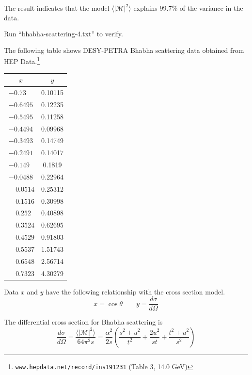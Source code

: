 \documentclass[12pt]{article}
\begin{document}
\noindent
The result indicates that the model $\langle|\mathcal{M}|^2\rangle$ explains
99.7\% of the variance in the data.

\bigskip
\noindent
Run ``bhabha-scattering-4.txt'' to verify.

\newpage
\noindent
The following table shows DESY-PETRA Bhabha scattering data obtained from
HEP Data.\footnote{{\tt www.hepdata.net/record/ins191231} (Table 3, 14.0 GeV)}

\begin{center}
\begin{tabular}{|c|c|}
\hline
$x$ & $y$\\
\hline
$-0.73\phantom{00}$ & 0.10115\\
$-0.6495$ & 0.12235\\
$-0.5495$ & 0.11258\\
$-0.4494$ & 0.09968\\
$-0.3493$ & 0.14749\\
$-0.2491$ & 0.14017\\
$-0.149\phantom{0}$ & 0.1819\phantom{0}\\
$-0.0488$ & 0.22964\\
$\phantom{+}0.0514$ & 0.25312\\
$\phantom{+}0.1516$ & 0.30998\\
$\phantom{+}0.252\phantom{0}$ & 0.40898\\
$\phantom{+}0.3524$ & 0.62695\\
$\phantom{+}0.4529$ & 0.91803\\
$\phantom{+}0.5537$ & 1.51743\\
$\phantom{+}0.6548$ & 2.56714\\
$\phantom{+}0.7323$ & 4.30279\\
\hline
\end{tabular}
\end{center}

\noindent
Data $x$ and $y$ have the following relationship
with the cross section model.
\begin{equation*}
x=\cos\theta
\qquad
y=\frac{d\sigma}{d\Omega}
\end{equation*}

\noindent
The differential cross section for Bhabha scattering is
\begin{equation*}
\frac{d\sigma}{d\Omega}
=\frac{\langle|\mathcal{M}|^2\rangle}{64\pi^2s}
=\frac{\alpha^2}{2s}
\left(\frac{s^2+u^2}{t^2}+\frac{2u^2}{st}+\frac{t^2+u^2}{s^2}\right)
\end{equation*}
\end{document}
